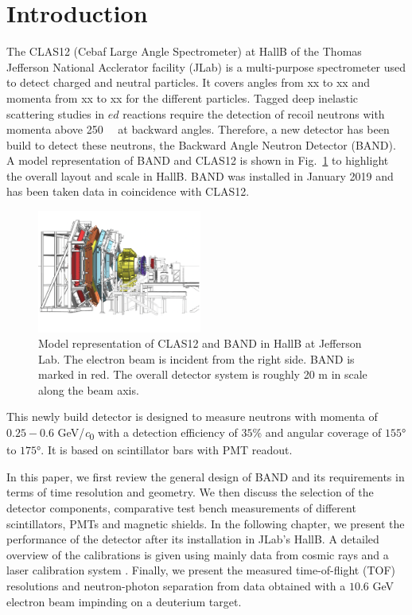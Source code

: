 \documentclass[3p,final,twocolumn]{elsarticle}
\begin{document}
\linenumbers

\section{Introduction}


The CLAS12 (Cebaf Large Angle Spectrometer) \cite{Burkert:2020akg} at HallB of the Thomas Jefferson National Acclerator facility (JLab) is a multi-purpose spectrometer used to detect charged and neutral particles. It covers angles from xx to xx and momenta from xx to xx for the different particles. 
Tagged deep inelastic scattering studies in $ed$ reactions require the detection of recoil neutrons with momenta above \SI{250}{\mega\eVperc} at backward angles. Therefore, a new detector has been build to detect these neutrons, the Backward Angle Neutron Detector (BAND). A model representation of BAND and CLAS12 is shown in Fig.~\ref{fig:clas12band} to highlight the overall layout and scale in HallB. BAND was installed in January 2019 and has been taken data in coincidence with CLAS12.

\begin{figure}[t!]
	\centering
	\includegraphics[width=0.48\textwidth]{BandInClas.pdf}
		\caption{Model representation of CLAS12 and BAND in HallB at Jefferson Lab. The electron beam is incident from the right side. BAND is marked in red. The overall detector system is roughly 20 \si{\meter} in scale along the beam axis. }
		\label{fig:clas12band}
\end{figure}

This newly build detector is designed to measure neutrons with momenta of $0.25 - 0.6$ \si{\GeV/\clight} with a detection efficiency of $35$\%  and angular coverage of $155$\si{\degree} to $175$\si{\degree}. It is based on scintillator bars with PMT readout. 

In this paper, we first review the general design of BAND and its requirements in terms of time resolution and geometry. We then discuss the selection of the detector components,
comparative test bench measurements of different scintillators, PMTs and magnetic shields. In the following chapter, we present the performance of the detector after its installation in JLab's HallB. A detailed overview of the calibrations is given using mainly data from cosmic rays and a laser calibration system \cite{band-laser}. Finally, we present the measured time-of-flight (TOF) resolutions and neutron-photon separation from  data obtained with a $10.6$ \si{\GeV} electron beam impinding on a deuterium target.
\end{document}
